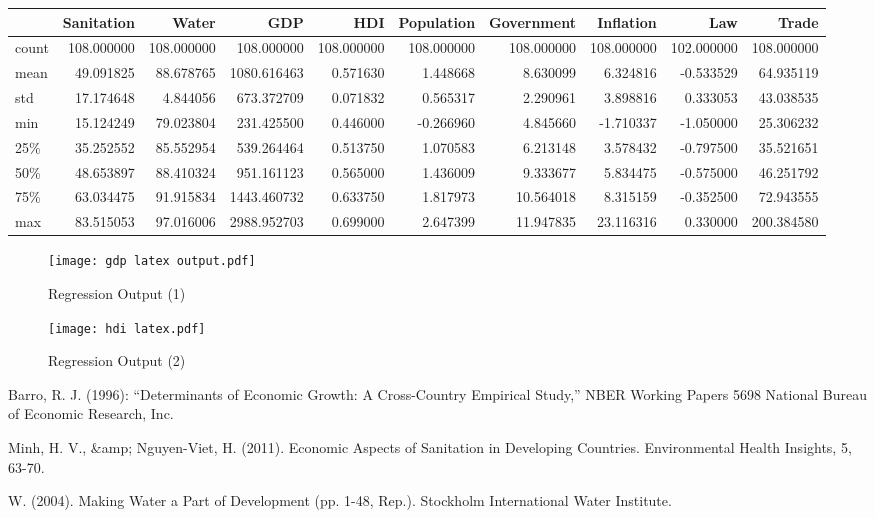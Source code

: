 \documentclass{article}
\begin{document}
\begin{landscape}
\begin{tabular}{lrrrrrrrrr}
\caption{\textbf{Table 4}}
\toprule
{} &  Sanitation &       Water &          GDP &         HDI &  Population &  Government &   Inflation &         Law &       Trade \\
\midrule
count &  108.000000 &  108.000000 &   108.000000 &  108.000000 &  108.000000 &  108.000000 &  108.000000 &  102.000000 &  108.000000 \\
mean  &   49.091825 &   88.678765 &  1080.616463 &    0.571630 &    1.448668 &    8.630099 &    6.324816 &   -0.533529 &   64.935119 \\
std   &   17.174648 &    4.844056 &   673.372709 &    0.071832 &    0.565317 &    2.290961 &    3.898816 &    0.333053 &   43.038535 \\
min   &   15.124249 &   79.023804 &   231.425500 &    0.446000 &   -0.266960 &    4.845660 &   -1.710337 &   -1.050000 &   25.306232 \\
25\%   &   35.252552 &   85.552954 &   539.264464 &    0.513750 &    1.070583 &    6.213148 &    3.578432 &   -0.797500 &   35.521651 \\
50\%   &   48.653897 &   88.410324 &   951.161123 &    0.565000 &    1.436009 &    9.333677 &    5.834475 &   -0.575000 &   46.251792 \\
75\%   &   63.034475 &   91.915834 &  1443.460732 &    0.633750 &    1.817973 &   10.564018 &    8.315159 &   -0.352500 &   72.943555 \\
max   &   83.515053 &   97.016006 &  2988.952703 &    0.699000 &    2.647399 &   11.947835 &   23.116316 &    0.330000 &  200.384580 \\
\bottomrule
\end{tabular}




\end{landscape}

\begin{figure}[h!]
\centering
\texttt{[image: gdp latex output.pdf]}
\caption{Regression Output (1)}
\label{fig:universe}
\end{figure}

\begin{figure}[h!]
\centering
\texttt{[image: hdi latex.pdf]}
\caption{Regression Output (2)}
\label{fig:universe}
\end{figure}







Barro, R. J. (1996): “Determinants of Economic Growth: A Cross-Country Empirical Study,” NBER Working Papers 5698 National Bureau of Economic Research, Inc.

\bigskip

\noindent Minh, H. V., &amp; Nguyen-Viet, H. (2011). Economic Aspects of Sanitation in Developing Countries. Environmental Health Insights, 5, 63-70.

\bigskip

\noindent W. (2004). Making Water a Part of Development (pp. 1-48, Rep.). Stockholm International Water Institute.
\end{document}
